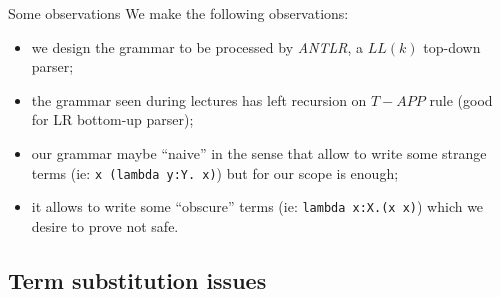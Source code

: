 \documentclass[8pt]{beamer}
\begin{document}
\begin{frame}{Some observations}
    We make the following observations:
      \begin{itemize}
        \item we design the grammar to be processed by \emph{ANTLR}, a $LL(k)$
            top-down parser;
        \item the grammar seen during lectures has left recursion on 
            $T-APP$ rule (good for LR bottom-up parser);
        \item our grammar maybe ``naive'' in the sense that allow to write 
            some strange terms (ie: \texttt{x (lambda y:Y. x)}) but for our 
            scope is enough;
        \item it allows to write some ``obscure'' terms (ie: 
            \texttt{lambda x:X.(x x)}) which we desire to prove not safe.
    \end{itemize}
\end{frame}

\subsection{Term substitution issues}
\end{document}
